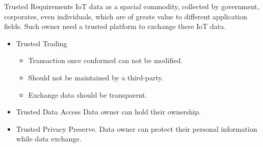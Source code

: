 \documentclass[10pt]{beamer}
\begin{document}
\begin{frame}{Trusted Requirements}
	IoT data as a spacial commodity, collected by government, corporates, even individuals, which are of greate value to different application fields. Such owner need a trusted platform to exchange there IoT data.

  \begin{itemize}[<+- | alert@+>]
     \item[] \begin{exampleblock}{Trusted Trading}
        \begin{itemize}
		  \item Transaction once conformed can not be modified.
		  \item Should not be maintained by a third-party.
		  \item Exchange data should be transparent.
 		\end{itemize}
      \end{exampleblock}
         \item[] \begin{exampleblock}{Trusted Data Access}
			 Data owner can hold their ownership.
      \end{exampleblock}
        \item[] \begin{exampleblock}{Trusted Privacy Preserve.}
        Data owner can protect their personal information while data exchange.
      \end{exampleblock}
  \end{itemize}
\end{frame}
\end{document}
